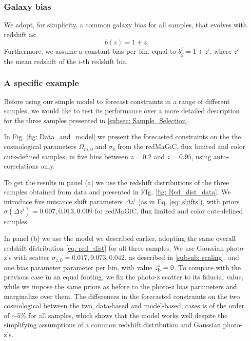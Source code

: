 \documentclass[a4paper,fleqn,usenatbib]{mnras}
\begin{document}
\subsubsection{Galaxy bias}

We adopt, for simplicity, a common  galaxy bias for all samples, that evolves with redshift as:
\begin{equation}
b(z) = 1 + z.
\end{equation}
Furthermore, we assume a constant bias per bin, equal to $b_g^i = 1 + \bar{z}^i$, where $\bar{z}^i$ the mean redshift of the $i$-th redshift bin.

\subsubsection{A specific example}
\label{subsub: example}

Before using our simple model to forecast constraints in a range of different samples, we would like to test its performance over a more detailed description for the three samples presented in \ref{subsec: Sample_Selection}.

In Fig. \ref{fig: Data_and_model} we present the forecasted constraints on the the cosmological parameters $\Omega_{m,0}$ and $\sigma_8$ from the redMaGiC, flux limited and color cuts-defined samples, in five bins between $z=0.2$ and $z=0.95$, using auto-correlations only.

To get the results in panel (a) we use the redshift distributions of the three samples obtained from data and presented in FIg. \ref{fig: Red_dist_data}. We introduce five nuisance shift parameters $\Delta z^i$ (as in Eq. \ref{eq: shifts}), with priors $\sigma(\Delta z^i) = 0.007, 0.013, 0.009$ for redMaGiC, flux limited and color cuts-defined samples. 

In panel (b) we use the model we described earlier, adopting the same overall redshift distribution \eqref{eq: red_dist} for all three samples. We use Gaussian photo-z's with scatter $\sigma_{z,0} = 0.017, 0.073, 0.042$, as described in \ref{subsub: scaling}, and one bias parameter parameter per bin, with value $z_{\mbox{\scriptsize{b}}}^i = 0$. To compare with the previous case in an equal footing, we fix the photo-z scatter to its fiducial value, while we impose the same priors as before to the photo-z bias parameters and marginalize over them. The differences in the forecasted constraints on the two cosmological between the two, data-based and model-based, cases is of the order of $\sim 5\%$ for all samples, which shows that the model works well despite the simplifying assumptions of a common redshift distribution and Gaussian photo-z's.
\end{document}
